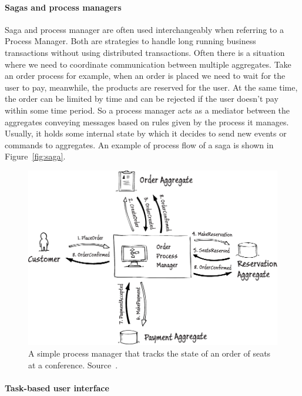\documentclass{book}
\begin{document}
\paragraph{Sagas and process managers}\label{sagas-and-process-managers}

Saga and process manager are often used interchangeably when referring
to a Process Manager. Both are strategies to handle long running
business transactions without using distributed transactions. Often
there is a situation where we need to coordinate communication between
multiple aggregates. Take an order process for example, when an order is
placed we need to wait for the user to pay, meanwhile, the products are
reserved for the user. At the same time, the order can be limited by
time and can be rejected if the user doesn't pay within some time
period. So a process manager acts as a mediator between the aggregates
conveying messages based on rules given by the process it manages.
Usually, it holds some internal state by which it decides to send new
events or commands to aggregates. An example of process flow of a saga
is shown in Figure~\ref{fig:saga}.


\begin{figure}[h!]
\begin{center}
\includegraphics[width=1\columnwidth]{figures/saga/saga}
\caption[A simple process manager]{A simple process manager that tracks the state of an order of seats at a
conference. Source~\cite{journey}.%
}
\end{center}
\end{figure}

\paragraph{Task-based user interface}\label{task-based-user-interface}
\end{document}
